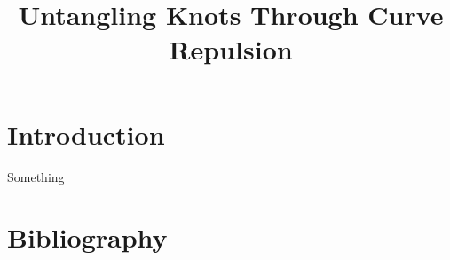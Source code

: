 \documentclass[a4paper, 12pt]{article}
\title{Untangling Knots Through Curve Repulsion}
\begin{document}

\section{Introduction}


Something \cite{YSC2021}

\section{Bibliography}
\printbibliography
\end{document}
